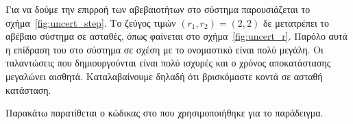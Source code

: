 Για να δούμε την επιρροή των αβεβαιοτήτων στο σύστημα παρουσιάζεται το
σχήμα~\ref{fig:uncert_step}. Το ζεύγος τιμών \( (r_1, r_2) = (2, 2) \) δε
μετατρέπει το αβέβαιο σύστημα σε ασταθές, όπως φαίνεται στο σχήμα~\ref{fig:uncert_r}.
Παρόλο αυτά η επίδραση του στο σύστημα σε σχέση με το ονομαστικό είναι πολύ μεγάλη.
Οι ταλαντώσεις που δημιουργούνται είναι πολύ ισχυρές και ο χρόνος αποκατάστασης
μεγαλώνει αισθητά. Καταλαβαίνουμε δηλαδή ότι βρισκόμαστε κοντά σε ασταθή
κατάσταση.

Παρακάτω παρατίθεται ο κώδικας στο  που χρησιμοποιήθηκε για το
παράδειγμα.
\eng{}
